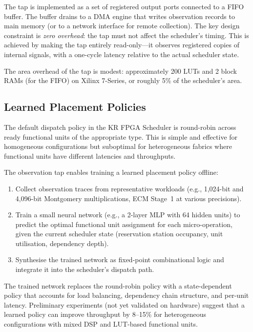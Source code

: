 \documentclass[11pt,a4paper]{article}
\begin{document}
The tap is implemented as a set of registered output ports connected to a
FIFO buffer.  The buffer drains to a DMA engine that writes observation
records to main memory (or to a network interface for remote collection).
The key design constraint is \emph{zero overhead}: the tap must not affect
the scheduler's timing.  This is achieved by making the tap entirely
read-only---it observes registered copies of internal signals, with a
one-cycle latency relative to the actual scheduler state.

The area overhead of the tap is modest: approximately 200 LUTs and 2 block
RAMs (for the FIFO) on Xilinx 7-Series, or roughly 5\% of the scheduler's
area.

\subsection{Learned Placement Policies}
\label{sec:learned-placement}

The default dispatch policy in the KR FPGA Scheduler is round-robin across
ready functional units of the appropriate type.  This is simple and
effective for homogeneous configurations but suboptimal for heterogeneous
fabrics where functional units have different latencies and throughputs.

The observation tap enables training a learned placement policy offline:

\begin{enumerate}[leftmargin=*]
  \item Collect observation traces from representative workloads (e.g.,
    1,024-bit and 4,096-bit Montgomery multiplications, ECM Stage~1 at
    various precisions).

  \item Train a small neural network (e.g., a 2-layer MLP with 64 hidden
    units) to predict the optimal functional unit assignment for each
    micro-operation, given the current scheduler state (reservation station
    occupancy, unit utilisation, dependency depth).

  \item Synthesise the trained network as fixed-point combinational logic
    and integrate it into the scheduler's dispatch path.
\end{enumerate}

The trained network replaces the round-robin policy with a state-dependent
policy that accounts for load balancing, dependency chain structure, and
per-unit latency.  Preliminary experiments (not yet validated on hardware)
suggest that a learned policy can improve throughput by 8--15\% for
heterogeneous configurations with mixed DSP and LUT-based functional units.
\end{document}
